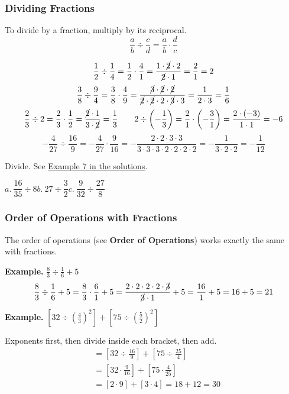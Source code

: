 \documentclass[letter]{article}
\newenvironment{keybox}
  {\begin{lrbox}{\keyboxsave}\begin{minipage}{\dimexpr\linewidth-2\fboxsep-2\fboxrule\relax}}
  {\end{minipage}\end{lrbox}\par\noindent\fbox{\usebox{\keyboxsave}}\par}
\newcommand{\exbox}[1]{\fbox{\textbf{Example #1}}}
\newcommand{\chp}{}
\newcommand{\seesol}[1]{See \hyperref[sec:\chp ex#1]{Example #1 in the solutions}.}
\begin{document}
\subsubsection*{Dividing Fractions}

\begin{keybox}
To divide by a fraction, multiply by its reciprocal.
\[\frac ab\div\frac cd=\frac ab\cdot\frac dc\]
\end{keybox}

\[
  \frac12\div\frac14=\frac12\cdot\frac41=\frac{1\cdot\cancel2\cdot2}{\cancel2\cdot1}=\frac21=2
\]
\[
  \frac38\div\frac94=\frac38\cdot\frac49=\frac{\cancel3\cdot\cancel2\cdot\cancel2}{\cancel2\cdot\cancel2\cdot2\cdot\cancel3\cdot3}=\frac1{2\cdot3}=\frac16
\]
\[
  \frac23\div2=\frac23\cdot\frac12=\frac{\cancel2\cdot1}{3\cdot\cancel2}=\frac13
\qquad
2\div\left(-\frac13\right)=\frac21\cdot\left(-\frac31\right)=\frac{2\cdot(-3)}{1\cdot1}=-6
\]
\[
  -\frac4{27}\div\frac{16}9=-\frac4{27}\cdot\frac9{16}=-\frac{2\cdot2\cdot3\cdot3}{3\cdot3\cdot3\cdot2\cdot2\cdot2\cdot2}=-\frac1{3\cdot2\cdot2}=-\frac1{12}
\]

\exbox{7} Divide. \seesol{7}

\begin{center}
$a.\ \dfrac{16}{35}\div8$\qquad\qquad $b.\ 27\div\dfrac32$\qquad\qquad $c.\ \dfrac9{32}\div\dfrac{27}8$
\end{center}

\subsubsection*{Order of Operations with Fractions}

The order of operations (see \textbf{Order of Operations}) works exactly the same with fractions.

\textbf{Example.} $\displaystyle\frac83\div\frac16+5$
\[
  \frac83\div\frac16+5=\frac83\cdot\frac61+5=\frac{2\cdot2\cdot2\cdot2\cdot\cancel3}{\cancel3\cdot1}+5=\frac{16}1+5=16+5=21
\]

\textbf{Example.} $\displaystyle\left[32\div\left(\frac43\right)^2\right]+\left[75\div\left(\frac52\right)^2\right]$

Exponents first, then divide inside each bracket, then add.
\begin{align*}
  &=\left[32\div\frac{16}9\right]+\left[75\div\frac{25}4\right]\\
  &=\left[32\cdot\frac9{16}\right]+\left[75\cdot\frac4{25}\right]\\
  &=\left[2\cdot9\right]+\left[3\cdot4\right]=18+12=30
\end{align*}
\end{document}
